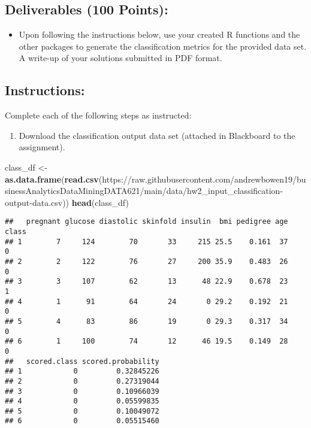 \documentclass[
]{article}
\newenvironment{Shaded}{\begin{snugshade}}{\end{snugshade}}
\newcommand{\FunctionTok}[1]{\textcolor[rgb]{0.13,0.29,0.53}{\textbf{#1}}}
\newcommand{\NormalTok}[1]{#1}
\newcommand{\OtherTok}[1]{\textcolor[rgb]{0.56,0.35,0.01}{#1}}
\newcommand{\StringTok}[1]{\textcolor[rgb]{0.31,0.60,0.02}{#1}}
\providecommand{\tightlist}{%
  \setlength{\itemsep}{0pt}\setlength{\parskip}{0pt}}
\begin{document}
\hypertarget{deliverables-100-points}{%
\subsection{Deliverables (100 Points):}\label{deliverables-100-points}}

\begin{itemize}
\tightlist
\item
  Upon following the instructions below, use your created R functions
  and the other packages to generate the classification metrics for the
  provided data set. A write-up of your solutions submitted in PDF
  format.
\end{itemize}

\hypertarget{instructions}{%
\subsection{Instructions:}\label{instructions}}

Complete each of the following steps as instructed:

\begin{enumerate}
\def\labelenumi{\arabic{enumi}.}
\tightlist
\item
  Download the classification output data set (attached in Blackboard to
  the assignment).
\end{enumerate}

\begin{Shaded}
\begin{Highlighting}[]
\NormalTok{class\_df }\OtherTok{\textless{}{-}} \FunctionTok{as.data.frame}\NormalTok{(}\FunctionTok{read.csv}\NormalTok{(}\StringTok{\textquotesingle{}https://raw.githubusercontent.com/andrewbowen19/businessAnalyticsDataMiningDATA621/main/data/hw2\_input\_classification{-}output{-}data.csv\textquotesingle{}}\NormalTok{))}
\FunctionTok{head}\NormalTok{(class\_df)}
\end{Highlighting}
\end{Shaded}

\begin{verbatim}
##   pregnant glucose diastolic skinfold insulin  bmi pedigree age class
## 1        7     124        70       33     215 25.5    0.161  37     0
## 2        2     122        76       27     200 35.9    0.483  26     0
## 3        3     107        62       13      48 22.9    0.678  23     1
## 4        1      91        64       24       0 29.2    0.192  21     0
## 5        4      83        86       19       0 29.3    0.317  34     0
## 6        1     100        74       12      46 19.5    0.149  28     0
##   scored.class scored.probability
## 1            0         0.32845226
## 2            0         0.27319044
## 3            0         0.10966039
## 4            0         0.05599835
## 5            0         0.10049072
## 6            0         0.05515460
\end{verbatim}
\end{document}
